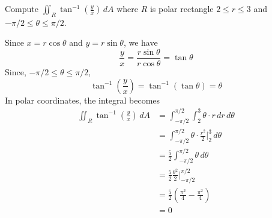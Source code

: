 \documentclass[handout]{ximera}
\begin{document}
\begin{example}[Example 2]
Compute $\iint_R \tan^{-1}\left(\frac{y}{x}\right) \, dA$ where $R$ is polar rectangle $ 2 \leq r \leq 3$ and $-\pi/2 \leq \theta \leq \pi/2$.\\

\begin{image}
\end{image}

Since $x = r\cos \theta$ and $y = r\sin \theta$, we have
\[
\frac{y}{x} = \frac{r\sin \theta}{r\cos\theta} = \tan \theta
\]
Since, $-\pi/2 \leq \theta \leq \pi/2$,
\[
\tan^{-1} \left(\frac{y}{x}\right) = \tan^{-1} (\tan \theta) = \theta
\]
In polar coordinates, the integral becomes
\begin{align*}
\iint_R \tan^{-1}\left(\frac{y}{x}\right) \, dA & = \int_{-\pi/2}^{\pi/2} \int_2^3 \theta \cdot r \, dr \, d\theta\\
                                                & = \int_{-\pi/2}^{\pi/2}  \theta \cdot \frac{r^2}{2}\bigg|_2^3 \, d\theta\\
                                                & = \frac52 \int_{-\pi/2}^{\pi/2}  \theta \, d\theta\\
                                                &= \frac52 \frac{\theta^2}{2} \bigg|_{-\pi/2}^{\pi/2}\\
                                                &= \frac52 \left(\frac{\pi^2}{4} - \frac{\pi^2}{4}\right)\\
                                                &= 0
\end{align*}  

\end{example}
\end{document}

